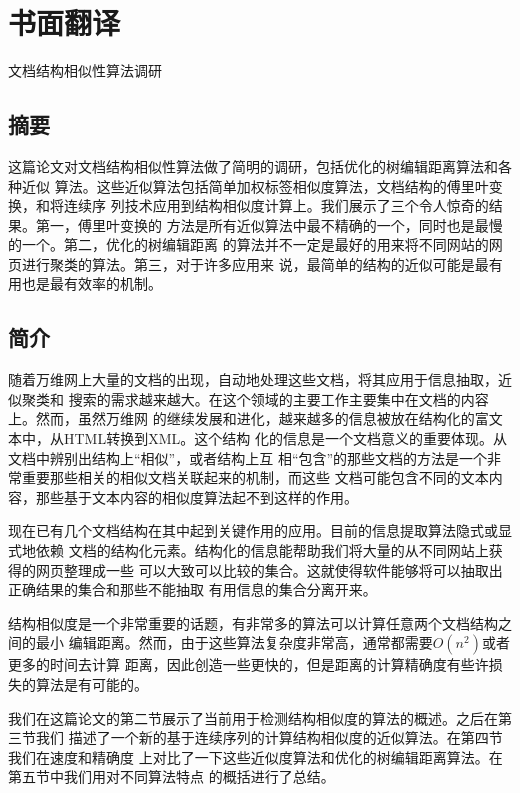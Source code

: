 
\chapter{书面翻译}
\label{chap:translation}
\begin{center}
       \Large{文档结构相似性算法调研}
\end{center}

\section*{摘要}
  这篇论文对文档结构相似性算法做了简明的调研，包括优化的树编辑距离算法和各种近似
  算法。这些近似算法包括简单加权标签相似度算法，文档结构的傅里叶变换，和将连续序
  列技术应用到结构相似度计算上。我们展示了三个令人惊奇的结果。第一，傅里叶变换的
  方法是所有近似算法中最不精确的一个，同时也是最慢的一个。第二，优化的树编辑距离
  的算法并不一定是最好的用来将不同网站的网页进行聚类的算法。第三，对于许多应用来
  说，最简单的结构的近似可能是最有用也是最有效率的机制。
\section{简介}
随着万维网上大量的文档的出现，自动地处理这些文档，将其应用于信息抽取，近似聚类和
搜索的需求越来越大。在这个领域的主要工作主要集中在文档的内容上。然而，虽然万维网
的继续发展和进化，越来越多的信息被放在结构化的富文本中，从HTML转换到XML。这个结构
化的信息是一个文档意义的重要体现。从文档中辨别出结构上“相似”，或者结构上互
相“包含”的那些文档的方法是一个非常重要那些相关的相似文档关联起来的机制，而这些
文档可能包含不同的文本内容，那些基于文本内容的相似度算法起不到这样的作用。

现在已有几个文档结构在其中起到关键作用的应用。目前的信息提取算法隐式或显式地依赖
文档的结构化元素。结构化的信息能帮助我们将大量的从不同网站上获得的网页整理成一些
可以大致可以比较的集合。这就使得软件能够将可以抽取出正确结果的集合和那些不能抽取
有用信息的集合分离开来。

结构相似度是一个非常重要的话题，有非常多的算法可以计算任意两个文档结构之间的最小
编辑距离。然而，由于这些算法复杂度非常高，通常都需要$O(n^2)$或者更多的时间去计算
距离，因此创造一些更快的，但是距离的计算精确度有些许损失的算法是有可能的。

我们在这篇论文的第二节展示了当前用于检测结构相似度的算法的概述。之后在第三节我们
描述了一个新的基于连续序列的计算结构相似度的近似算法。在第四节我们在速度和精确度
上对比了一下这些近似度算法和优化的树编辑距离算法。在第五节中我们用对不同算法特点
的概括进行了总结。

